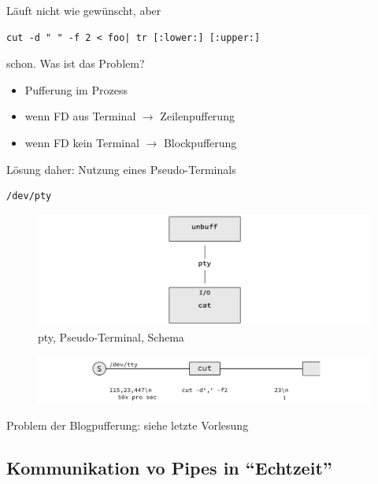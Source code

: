 				Läuft nicht wie gewünscht, aber
			
				\lstShell
				\begin{lstlisting}
cut -d " " -f 2 < foo| tr [:lower:] [:upper:]
				\end{lstlisting}

				schon. Was ist das Problem?

				\begin{itemize}
					\item Pufferung im Prozess
					\item wenn FD aus Terminal $\rightarrow$ Zeilenpufferung
					\item wenn FD kein Terminal $\rightarrow$ Blockpufferung
				\end{itemize}

				Lösung daher: Nutzung eines Pseudo-Terminals

				\lstShell
				\begin{lstlisting}
/dev/pty
				\end{lstlisting}

				\begin{figure}[hbtp]
					\caption{pty, Pseudo-Terminal, Schema}
					\includegraphics[width=\textwidth]{workfiles/v4_2}
				\end{figure}

				\begin{figure}[hbtp]
					\includegraphics[width=\textwidth]{workfiles/v5_1}
				\end{figure}

				Problem der Blogpufferung: siehe letzte Vorlesung




		\subsection*{Kommunikation vo Pipes in "`Echtzeit"'} %
		\label{sub:kommunikation_vo_pipes_in_}

